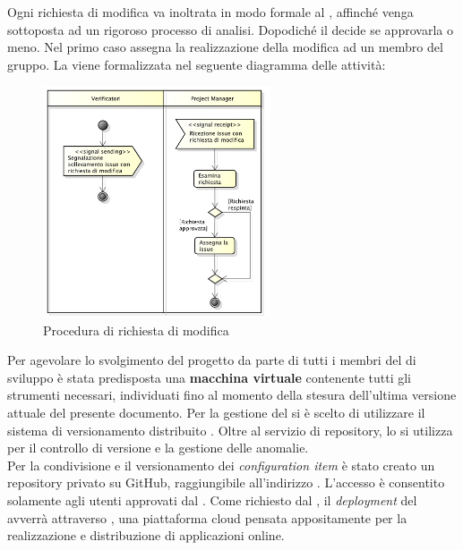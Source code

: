 			\label{sec:StrutturaIssue}
				Ogni richiesta di modifica va inoltrata in modo formale al , affinché venga sottoposta ad un rigoroso processo di analisi. Dopodiché il  decide se approvarla o meno. Nel primo caso assegna la realizzazione della modifica ad un membro del gruppo. 
				La  viene formalizzata nel seguente diagramma delle attività:
				\begin{figure}[H]
					\centering
					\includegraphics[width=0.6\textwidth]{NormeDiProgetto/Pics/RichiestaModifica}
					\caption{Procedura di richiesta di modifica}
				\end{figure}
						
		Per agevolare lo svolgimento del progetto da parte di tutti i membri del  di sviluppo è stata predisposta una \textbf{macchina virtuale} contenente tutti gli strumenti  necessari, individuati fino al momento della stesura dell'ultima versione attuale del presente documento.
			Per la gestione del  si è scelto di utilizzare il sistema di versionamento distribuito . Oltre al servizio di repository, lo si utilizza per il controllo di versione e la gestione delle anomalie. \\
			Per la condivisione e il versionamento dei \textit{configuration item} è stato creato un repository privato su GitHub, raggiungibile all’indirizzo . L’accesso è consentito solamente agli utenti approvati dal .
			Come richiesto dal , il \textit{deployment} del  avverrà attraverso , una piattaforma cloud pensata appositamente per la realizzazione e distribuzione di applicazioni online.